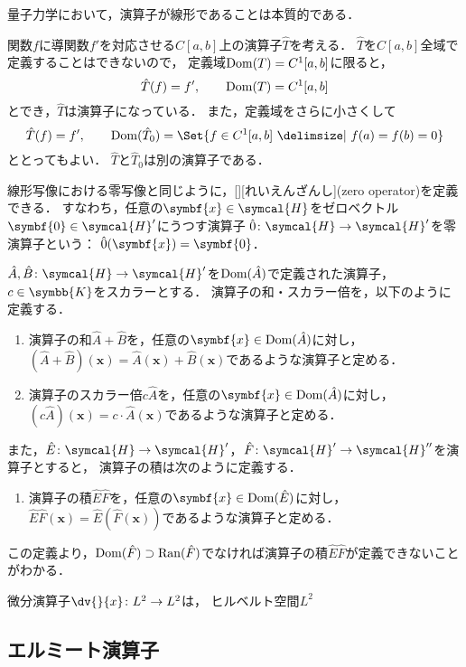 \documentclass[../sotsu.tex]{subfiles}
\begin{document}
量子力学において，演算子が線形であることは本質的である．

\begin{example}
    関数$f$に導関数$f'$を対応させる$C[a, b]$上の演算子$\hat{T}$を考える．
    $\hat{T}$を$C[a, b]$全域で定義することはできないので，
    定義域$\operatorname{Dom}(T) = C^1 [a, b]$に限ると，
    \begin{equation*}
        \hat{T}(f) = f',  \qquad  
        \operatorname{Dom}(T) = C^1 [a, b]
    \end{equation*}
    とでき，$\hat{T}$は演算子になっている\cite[\S 2.1]{kuroda-qphys-2007}．
    また，定義域をさらに小さくして
    \begin{equation*}
        \hat{T}(f) = f',  \qquad  
        \domain(\hat{T}_0) = \Set{ f \in C^1 [a, b]  \given  f(a) = f(b) = 0 }
    \end{equation*}
    ととってもよい．
    $\hat{T}$と$\hat{T}_0$は別の演算子である．
\end{example}

線形写像における零写像と同じように，[][れいえんざんし](zero operator)を定義できる．
すなわち，任意の$\symbf{x} \in \symcal{H}$をゼロベクトル$\symbf{0} \in \symcal{H}'$にうつす演算子
$\zeroop \colon \symcal{H} \to \symcal{H}'$を零演算子という：
$\zeroop(\symbf{x}) = \symbf{0}$．

\begin{definition}
    \label{dfn:operator-sum-scalar}
    $\hat{A}, \hat{B} \colon \symcal{H} \to \symcal{H}'$を$\operatorname{Dom}(\hat{A})$で定義された演算子，
    $c \in \symbb{K}$をスカラーとする．
    演算子の和・スカラー倍を，以下のように定義する．
    \begin{enumerate}
        \item 演算子の和$\hat{A} + \hat{B}$を，任意の$\symbf{x} \in \domain(\hat{A})$に対し，
            $( \hat{A} + \hat{B} )(\symbf{x}) = \hat{A}(\symbf{x}) + \hat{B}(\symbf{x})$であるような演算子と定める．
        \item 演算子のスカラー倍$c\hat{A}$を，任意の$\symbf{x} \in \domain(\hat{A})$に対し，
            $( c\hat{A} )(\symbf{x}) = c \cdotp \hat{A}(\symbf{x})$であるような演算子と定める．
    \end{enumerate}
    また，$\hat{E} \colon \symcal{H} \to \symcal{H}'$，$\hat{F} \colon \symcal{H}' \to \symcal{H}''$を演算子とすると，
    演算子の積は次のように定義する．
    \begin{enumerate}[resume]
        \item 演算子の積$\hat{E} \hat{F}$を，任意の$\symbf{x} \in \domain(\hat{E})$に対し，
            $ \hat{E} \hat{F} (\symbf{x}) = \hat{E} ( \hat{F} (\symbf{x}) )$であるような演算子と定める．
    \end{enumerate}
    この定義より，$\operatorname{Dom}(\hat{F}) \supset \operatorname{Ran}(\hat{F})$でなければ演算子の積$\hat{E} \hat{F}$が定義できないことがわかる．
\end{definition}

微分演算子$\dv{}{x} \colon L^2 \to L^2$は，
ヒルベルト空間$L^2$




\subsection{エルミート演算子}
\label{sec:Hermitian-operator}
\end{document}

